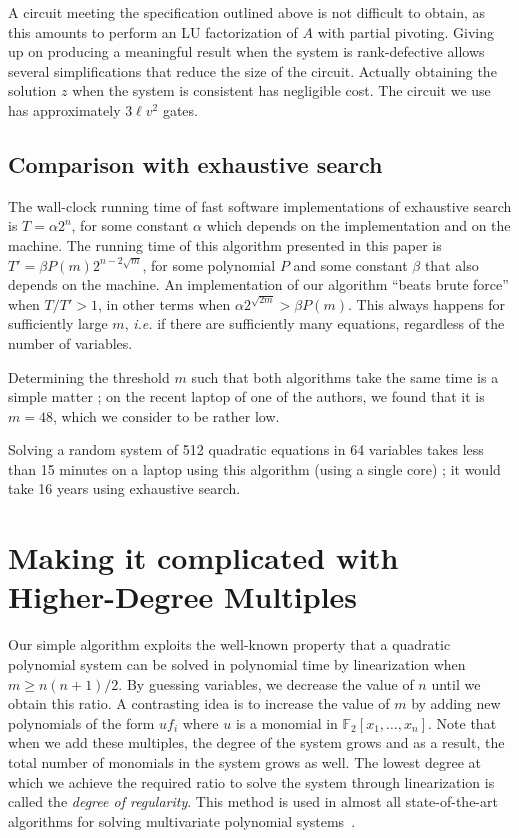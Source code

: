 \documentclass[a4paper,UKenglish,cleveref, autoref]{lipics-v2019}
\begin{document}
A circuit meeting the specification outlined above is not difficult to obtain,
as this amounts to perform an LU factorization of $A$ with partial
pivoting. Giving up on producing a meaningful result when the system is
rank-defective allows several simplifications that reduce the size of the
circuit. Actually obtaining the solution $z$ when the system is consistent has
negligible cost. The circuit we use has approximately $3\ell v^2$ gates.


\subsection{Comparison with exhaustive search}

The wall-clock running time of fast software implementations of exhaustive
search is $T = \alpha 2^n$, for some constant $\alpha$ which depends on the
implementation and on the machine. The running time of this algorithm presented
in this paper is $T' = \beta P(m) 2^{n - 2\sqrt{m}}$, for some polynomial $P$
and some constant $\beta$ that also depends on the machine. An implementation of
our algorithm ``beats brute force'' when $T/T' > 1$, in other terms when
$\alpha 2^{\sqrt{2m}} > \beta P(m)$. This always happens for sufficiently large
$m$, \textit{i.e.} if there are sufficiently many equations, regardless of the
number of variables.

Determining the threshold $m$ such that both algorithms take the same time is a
simple matter ; on the recent laptop of one of the authors, we found that it is
$m=48$, which we consider to be rather low.

Solving a random system of 512 quadratic equations in 64 variables takes less
than 15 minutes on a laptop using this algorithm (using a single core) ; it
would take 16 years using exhaustive search.


\section{Making it complicated with Higher-Degree Multiples}
\label{sec:extensions}


Our simple algorithm exploits the well-known property that a quadratic polynomial system can be solved in polynomial time by linearization when $m \geq n(n+1)/2$.
By guessing variables, we decrease the value of $n$ until we obtain this ratio. A contrasting idea is to increase the value of $m$ by adding new polynomials of the form $uf_i$ where $u$ is a monomial in $\mathbb{F}_2[x_1, \dots, x_n]$.
Note that when we add these multiples, the degree of the system grows and as a result, the total number of monomials in the system grows as well. The lowest degree at which we achieve the required ratio to solve the system through linearization is called the \textit{degree of regularity}. This method is used in almost all state-of-the-art algorithms for solving multivariate polynomial systems~\cite{F4,F5,CourtoisKPS00,BardetFSS13,JouxV17}. 
\end{document}
